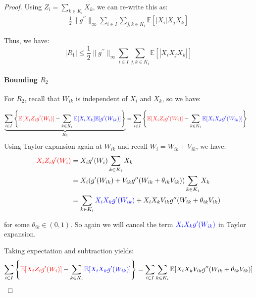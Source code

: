 \documentclass{article}
\begin{document}
\begin{proof}
Using $Z_i = \sum_{k\in K_i} X_k$, we can re-write this as:
\begin{align*}
    \frac{1}{2} \|g^{\prime \prime}\|_{\infty} \sum_{i\in I}\sum_{j,k\in K_{i}}\mathbb{E}[|X_{i}|X_{j}X_{k}]
\end{align*}


Thus, we have:
\begin{equation}\label{eq:bound_R1}
    |R_1| \leq \frac{1}{2} \|g^{\prime \prime}\|_{\infty} \sum_{i\in I}\sum_{j,k\in K_{i}}\mathbb{E}[|X_{i}X_{j}X_{k}|]
\end{equation}  


\paragraph{Bounding $R_2$} For $R_2$, recall that $W_{ik}$ is independent of $X_i$ and $X_k$, so we have:

\begin{align*}
    \underbrace{\sum_{i\in I}\left\{\textcolor{red}{{\mathbb{E}}[X_{i}Z_{i}g^{\prime}(W_{i})]}-\sum_{k\in K_{i}}\textcolor{blue}{{\mathbb{E}}[X_{i}X_{k}]{\mathbb{E}}[g^{\prime}(W_{i k})]}\right\}}_{R_2} &= \sum_{i\in I}\left\{\textcolor{red}{{\mathbb{E}}[X_{i}Z_{i}g^{\prime}(W_{i})]}-\sum_{k\in K_{i}}{\textcolor{blue}{\mathbb{E}[X_{i}X_{k}g^{\prime}(W_{i k})]}}\right\}
\end{align*}
Using Taylor expansion again at $W_{ik}$ and recall $W_i= W_{ik} + V_{ik}$,  we have:
\begin{align*}
    \textcolor{red}{X_i Z_i g'(W_i)} &= X_i g'(W_i) \sum_{k\in K_i} X_k\\
    &= X_i (g'(W_{ik}) + V_{ik} g''(W_{ik} + \theta_{ik} V_{ik}) )\sum_{k\in K_i} X_k  \\
    &= \sum_{k\in K_i} {\textcolor{blue}{X_{i}X_{k}g^{\prime}(W_{i k})}} + X_i X_k V_{ik} g''(W_{ik} + \theta_{ik} V_{ik}) 
\end{align*}

for some $\theta_{ik} \in (0,1)$. So again we will cancel the term ${\textcolor{blue}{X_{i}X_{k}g^{\prime}(W_{i k})}}$ in Taylor expansion.

Taking expectation and subtraction yields:
\begin{equation*}
    \sum_{i\in I}\left\{\textcolor{red}{{\mathbb{E}}[X_{i}Z_{i}g^{\prime}(W_{i})]}-\sum_{k\in K_{i}}{\textcolor{blue}{\mathbb{E}[X_{i}X_{k}g^{\prime}(W_{i k})]}}\right\} = \sum_{i\in I}\sum_{k\in K_{i}}{\mathbb{E}}[X_{i}X_{k} V_{ik} g^{\prime \prime}(W_{i k}+\theta_{i k} V_{i k})]
\end{equation*}


\end{proof}
\end{document}
